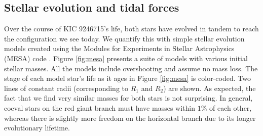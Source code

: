 \subsection{Stellar evolution and tidal forces}\label{tides}

Over the course of KIC 9246715's life, both stars have evolved in tandem to reach the configuration we see today. We quantify this with simple stellar evolution models created using the Modules for Experiments in Stellar Astrophysics (MESA) code \citep{pax11,pax13,pax15}. Figure \ref{fig:mesa} presents a suite of models with various initial stellar masses. All the models include overshooting and assume no mass loss.
The stage of each model star's life as it ages in Figure \ref{fig:mesa} is color-coded.
Two lines of constant radii (corresponding to $R_1$ and $R_2$) are shown. As expected, the fact that we find very similar masses for both stars is not surprising. In general, coeval stars on the red giant branch must have masses within $1\%$ of each other, whereas there is slightly more freedom on the horizontal branch due to its longer evolutionary lifetime.

